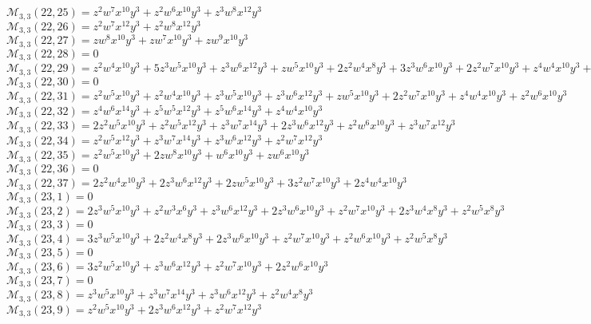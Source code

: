 $\mathcal{M}_{3,3}(22,25)=z^2w^7x^{10}y^3+z^2w^6x^{10}y^3+z^3w^8x^{12}y^3$\\
$\mathcal{M}_{3,3}(22,26)=z^2w^7x^{12}y^3+z^2w^8x^{12}y^3$\\
$\mathcal{M}_{3,3}(22,27)=zw^8x^{10}y^3+zw^7x^{10}y^3+zw^9x^{10}y^3$\\
$\mathcal{M}_{3,3}(22,28)=0$\\
$\mathcal{M}_{3,3}(22,29)=z^2w^4x^{10}y^3+5z^3w^5x^{10}y^3+z^3w^6x^{12}y^3+zw^5x^{10}y^3+2z^2w^4x^8y^3+3z^3w^6x^{10}y^3+2z^2w^7x^{10}y^3+z^4w^4x^{10}y^3+z^2w^5x^8y^3$\\
$\mathcal{M}_{3,3}(22,30)=0$\\
$\mathcal{M}_{3,3}(22,31)=z^2w^5x^{10}y^3+z^2w^4x^{10}y^3+z^3w^5x^{10}y^3+z^3w^6x^{12}y^3+zw^5x^{10}y^3+2z^2w^7x^{10}y^3+z^4w^4x^{10}y^3+z^2w^6x^{10}y^3$\\
$\mathcal{M}_{3,3}(22,32)=z^4w^6x^{14}y^3+z^5w^5x^{12}y^3+z^5w^6x^{14}y^3+z^4w^4x^{10}y^3$\\
$\mathcal{M}_{3,3}(22,33)=2z^2w^5x^{10}y^3+z^2w^5x^{12}y^3+z^3w^7x^{14}y^3+2z^3w^6x^{12}y^3+z^2w^6x^{10}y^3+z^3w^7x^{12}y^3$\\
$\mathcal{M}_{3,3}(22,34)=z^2w^5x^{12}y^3+z^3w^7x^{14}y^3+z^3w^6x^{12}y^3+z^2w^7x^{12}y^3$\\
$\mathcal{M}_{3,3}(22,35)=z^2w^5x^{10}y^3+2zw^8x^{10}y^3+w^6x^{10}y^3+zw^6x^{10}y^3$\\
$\mathcal{M}_{3,3}(22,36)=0$\\
$\mathcal{M}_{3,3}(22,37)=2z^2w^4x^{10}y^3+2z^3w^6x^{12}y^3+2zw^5x^{10}y^3+3z^2w^7x^{10}y^3+2z^4w^4x^{10}y^3$\\
$\mathcal{M}_{3,3}(23,1)=0$\\
$\mathcal{M}_{3,3}(23,2)=2z^3w^5x^{10}y^3+z^2w^3x^6y^3+z^3w^6x^{12}y^3+2z^3w^6x^{10}y^3+z^2w^7x^{10}y^3+2z^3w^4x^8y^3+z^2w^5x^8y^3$\\
$\mathcal{M}_{3,3}(23,3)=0$\\
$\mathcal{M}_{3,3}(23,4)=3z^3w^5x^{10}y^3+2z^2w^4x^8y^3+2z^3w^6x^{10}y^3+z^2w^7x^{10}y^3+z^2w^6x^{10}y^3+z^2w^5x^8y^3$\\
$\mathcal{M}_{3,3}(23,5)=0$\\
$\mathcal{M}_{3,3}(23,6)=3z^2w^5x^{10}y^3+z^3w^6x^{12}y^3+z^2w^7x^{10}y^3+2z^2w^6x^{10}y^3$\\
$\mathcal{M}_{3,3}(23,7)=0$\\
$\mathcal{M}_{3,3}(23,8)=z^3w^5x^{10}y^3+z^3w^7x^{14}y^3+z^3w^6x^{12}y^3+z^2w^4x^8y^3$\\
$\mathcal{M}_{3,3}(23,9)=z^2w^5x^{10}y^3+2z^3w^6x^{12}y^3+z^2w^7x^{12}y^3$\\
